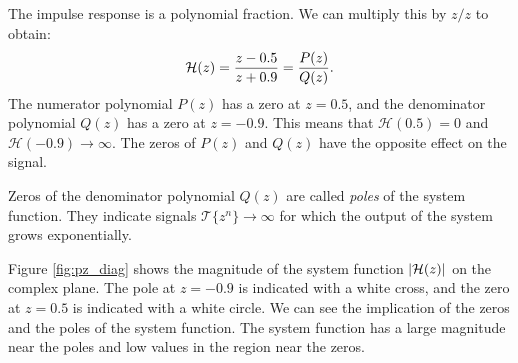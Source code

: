 The impulse response is a polynomial fraction. We can multiply this by
$z/z$ to obtain:
\begin{equation}
\mathcal{H}(z) = \frac{z-0.5}{z+0.9} = \frac{P(z)}{Q(z)}.
\label{eq:example_iir_system_hpf}
\end{equation}
The numerator polynomial $P(z)$ has a zero at $z=0.5$, and the
denominator polynomial $Q(z)$ has a zero at $z=-0.9$. This means that
$\mathcal{H}(0.5)=0$ and $\mathcal{H}(-0.9)\rightarrow \infty$. The
zeros of $P(z)$ and $Q(z)$ have the opposite effect on the signal.

Zeros of the denominator polynomial $Q(z)$ are called \emph{poles} of
the system function. They indicate signals
$\mathcal{T}\{z^{n}\} \rightarrow \infty$ for which the output of the
system grows exponentially.


Figure \ref{fig:pz_diag} shows the magnitude of the system function
$|\mathcal{H}(z)|$ on the complex plane. The pole at $z=-0.9$ is indicated with
a white cross, and the zero at $z=0.5$ is indicated with a white
circle. We can see the implication of the zeros and the poles of the
system function. The system function has a large magnitude near the
poles and low values in the region near the zeros.

